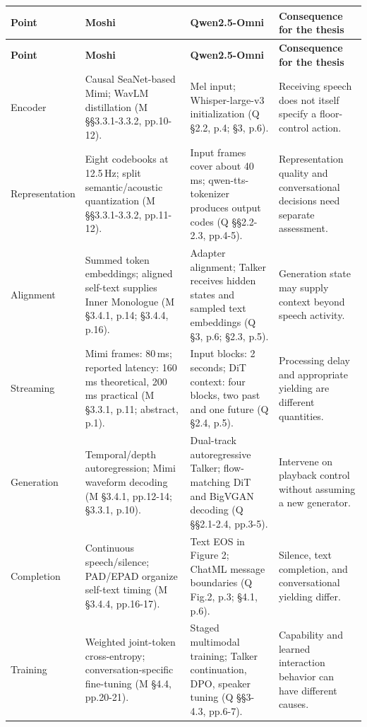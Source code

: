 \documentclass[11pt]{article}
\begin{document}
\begingroup
\small
\setlength{\tabcolsep}{4pt}
\begin{longtable}{
  >{\raggedright\arraybackslash}p{1.6cm}
  >{\raggedright\arraybackslash}p{4.5cm}
  >{\raggedright\arraybackslash}p{4.5cm}
  >{\raggedright\arraybackslash}p{4.1cm}
}
\toprule
\textbf{Point} & \textbf{Moshi} & \textbf{Qwen2.5-Omni} & \textbf{Consequence for the thesis} \\
\midrule
\endfirsthead
\toprule
\textbf{Point} & \textbf{Moshi} & \textbf{Qwen2.5-Omni} & \textbf{Consequence for the thesis} \\
\midrule
\endhead
\bottomrule
\endfoot
Encoder & Causal SeaNet-based Mimi; WavLM distillation (M §§3.3.1-3.3.2, pp.10-12). & Mel input; Whisper-large-v3 initialization (Q §2.2, p.4; §3, p.6). & Receiving speech does not itself specify a floor-control action. \\
Representation & Eight codebooks at 12.5\,Hz; split semantic/acoustic quantization (M §§3.3.1-3.3.2, pp.11-12). & Input frames cover about 40\,ms; qwen-tts-tokenizer produces output codes (Q §§2.2-2.3, pp.4-5). & Representation quality and conversational decisions need separate assessment. \\
Alignment & Summed token embeddings; aligned self-text supplies Inner Monologue (M §3.4.1, p.14; §3.4.4, p.16). & Adapter alignment; Talker receives hidden states and sampled text embeddings (Q §3, p.6; §2.3, p.5). & Generation state may supply context beyond speech activity. \\
Streaming & Mimi frames: 80\,ms; reported latency: 160\,ms theoretical, 200\,ms practical (M §3.3.1, p.11; abstract, p.1). & Input blocks: 2 seconds; DiT context: four blocks, two past and one future (Q §2.4, p.5). & Processing delay and appropriate yielding are different quantities. \\
Generation & Temporal/depth autoregression; Mimi waveform decoding (M §3.4.1, pp.12-14; §3.3.1, p.10). & Dual-track autoregressive Talker; flow-matching DiT and BigVGAN decoding (Q §§2.1-2.4, pp.3-5). & Intervene on playback control without assuming a new generator. \\
Completion & Continuous speech/silence; PAD/EPAD organize self-text timing (M §3.4.4, pp.16-17). & Text EOS in Figure 2; ChatML message boundaries (Q Fig.2, p.3; §4.1, p.6). & Silence, text completion, and conversational yielding differ. \\
Training & Weighted joint-token cross-entropy; conversation-specific fine-tuning (M §4.4, pp.20-21). & Staged multimodal training; Talker continuation, DPO, speaker tuning (Q §§3-4.3, pp.6-7). & Capability and learned interaction behavior can have different causes. \\
\end{longtable}
\endgroup
\end{document}
